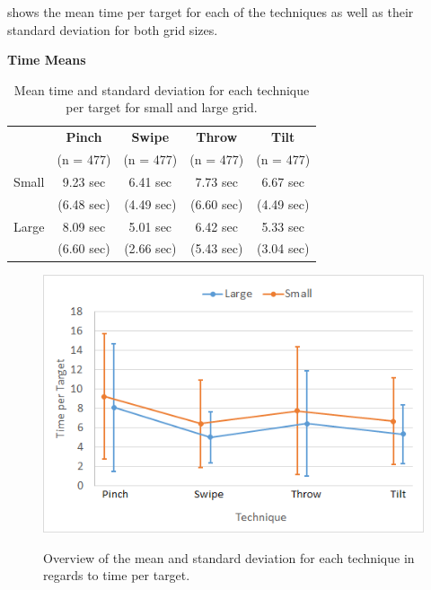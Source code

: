  shows the mean time per target for each of the techniques as well as their standard deviation for both grid sizes. 
\begin{table}[H]
	\centering
	\textbf{Time Means}\\[4pt]
	\begin{adjustbox}{width=\columnwidth}
	\begin{tabular}{|c|c|c|c|c|}
		\hline
		\rowcolor[HTML]{9B9B9B} 
		 & \textbf{Pinch} & \textbf{Swipe} & \textbf{Throw} & \textbf{Tilt} \\ 
		 \rowcolor[HTML]{9B9B9B} 
		 & (n = 477) & (n = 477) & (n = 477) & (n = 477) \\ \hline
		Small & 9.23 sec        & 6.41 sec          & 7.73 sec          & 6.67 sec         \\
		 & (6.48 sec)        & (4.49 sec)          & (6.60 sec)         & (4.49 sec)         \\ \hline
		Large & 8.09 sec         & 5.01 sec          & 6.42 sec          & 5.33 sec         \\
		 & (6.60 sec)         & (2.66 sec)          & (5.43 sec)      & (3.04 sec)         \\ \hline
	\end{tabular}
	\end{adjustbox}
	\caption{Mean time and standard deviation for each technique per target for small and large grid.}
	\label{tab:meanTimesTechnique}
\end{table}

\begin{figure}[H]
	{\includegraphics[width = 1\columnwidth ]{images/time.png}} 
	\caption{
		Overview of the mean and standard deviation for each technique in regards to time per target.
	}
	\label{fig:timeResults}
\end{figure}

